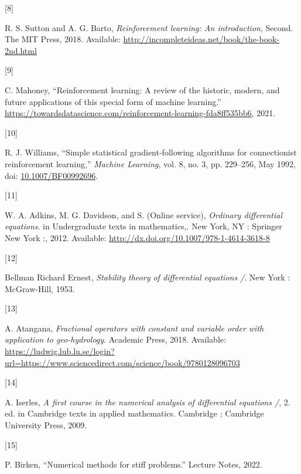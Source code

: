\documentclass[
  letterpaper,
]{report}
\newlength{\cslhangindent}
\newlength{\csllabelwidth}
\newlength{\cslentryspacingunit} %
\newenvironment{CSLReferences}[2] %
 {%
  \setlength{\parindent}{0pt}
  \ifodd #1
  \let\oldpar\par
  \def\par{\hangindent=\cslhangindent\oldpar}
  \fi
  \setlength{\parskip}{#2\cslentryspacingunit}
 }%
 {}
\newcommand{\CSLLeftMargin}[1]{\parbox[t]{\csllabelwidth}{#1}}
\newcommand{\CSLRightInline}[1]{\parbox[t]{\linewidth - \csllabelwidth}{#1}\break}
\theoremstyle{plain}
\theoremstyle{definition}
\theoremstyle{definition}
\theoremstyle{remark}
\begin{document}
\begin{CSLReferences}{0}{0}
\leavevmode{}%
\CSLLeftMargin{{[}8{]} }%
\CSLRightInline{R. S. Sutton and A. G. Barto, \emph{Reinforcement
learning: An introduction}, Second. The MIT Press, 2018. Available:
\url{http://incompleteideas.net/book/the-book-2nd.html}}

\leavevmode{}%
\CSLLeftMargin{{[}9{]} }%
\CSLRightInline{C. Mahoney, {``Reinforcement learning: A review of the
historic, modern, and future applications of this special form of
machine learning.''}
\url{https://towardsdatascience.com/reinforcement-learning-fda8ff535bb6},
2021.}

\leavevmode{}%
\CSLLeftMargin{{[}10{]} }%
\CSLRightInline{R. J. Williams, {``Simple statistical gradient-following
algorithms for connectionist reinforcement learning,''} \emph{Machine
Learning}, vol. 8, no. 3, pp. 229--256, May 1992, doi:
\href{https://doi.org/10.1007/BF00992696}{10.1007/BF00992696}.}

\leavevmode{}%
\CSLLeftMargin{{[}11{]} }%
\CSLRightInline{W. A. Adkins, M. G. Davidson, and S. (Online service),
\emph{Ordinary differential equations}. in Undergraduate texts in
mathematics,. New York, NY : Springer New York :, 2012. Available:
\url{http://dx.doi.org/10.1007/978-1-4614-3618-8}}

\leavevmode{}%
\CSLLeftMargin{{[}12{]} }%
\CSLRightInline{Bellman Richard Ernest, \emph{Stability theory of
differential equations /}. New York : McGraw-Hill, 1953.}

\leavevmode{}%
\CSLLeftMargin{{[}13{]} }%
\CSLRightInline{A. Atangana, \emph{Fractional operators with constant
and variable order with application to geo-hydrology}. Academic Press,
2018. Available:
\url{https://ludwig.lub.lu.se/login?url=https://www.sciencedirect.com/science/book/9780128096703}}

\leavevmode{}%
\CSLLeftMargin{{[}14{]} }%
\CSLRightInline{A. Iserles, \emph{A first course in the numerical
analysis of differential equations /}, 2. ed. in Cambridge texts in
applied mathematics. Cambridge ; Cambridge University Press, 2009.}

\leavevmode{}%
\CSLLeftMargin{{[}15{]} }%
\CSLRightInline{P. Birken, {``Numerical methods for stiff problems.''}
Lecture Notes, 2022.}


\end{CSLReferences}
\end{document}
